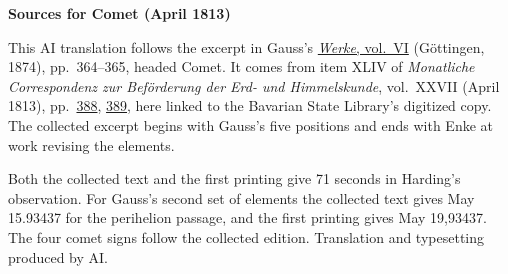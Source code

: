 \clearpage\thispagestyle{empty}
\begin{center}\textbf{Sources for Comet (April 1813)}\end{center}
\noindent This AI translation follows the excerpt in Gauss’s \href{https://gdz.sub.uni-goettingen.de/id/PPN236007467}{\textit{Werke}, vol.~VI} (Göttingen, 1874), pp.~364--365, headed Comet. It comes from item XLIV of \textit{Monatliche Correspondenz zur Beförderung der Erd- und Himmelskunde}, vol.~XXVII (April 1813), pp.~\href{https://api.digitale-sammlungen.de/iiif/image/v2/bsb10538616_00402/full/1600,/0/default.jpg}{388}, \href{https://api.digitale-sammlungen.de/iiif/image/v2/bsb10538616_00403/full/1600,/0/default.jpg}{389}, here linked to the Bavarian State Library’s digitized copy. The collected excerpt begins with Gauss’s five positions and ends with Enke at work revising the elements.
\par\smallskip\noindent Both the collected text and the first printing give 71 seconds in Harding’s observation. For Gauss’s second set of elements the collected text gives May 15.93437 for the perihelion passage, and the first printing gives May 19,93437. The four comet signs follow the collected edition. Translation and typesetting produced by AI.
\clearpage
